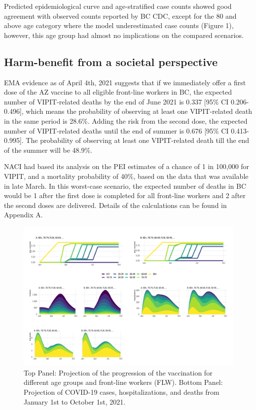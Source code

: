 \documentclass[]{interact}
\theoremstyle{plain}%
\theoremstyle{definition}
\theoremstyle{remark}
\begin{document}
Predicted epidemiological curve and age-stratified case counts showed
good agreement with observed counts reported by BC CDC, except for the
80 and above age category where the model underestimated case counts
(Figure 1), however, this age group had almost no implications on the
compared scenarios.

\hypertarget{harm-benefit-from-a-societal-perspective}{%
\subsection{Harm-benefit from a societal
perspective}\label{harm-benefit-from-a-societal-perspective}}

EMA evidence as of April 4th, 2021 suggests that if we immediately offer
a first dose of the AZ vaccine to all eligible front-line workers in BC,
the expected number of VIPIT-related deaths by the end of June 2021 is
0.337 {[}95\% CI 0.206-0.496{]}, which means the probability of
observing at least one VIPIT-related death in the same period is 28.6\%.
Adding the risk from the second dose, the expected number of
VIPIT-related deaths until the end of summer is 0.676 {[}95\% CI
0.413-0.995{]}. The probability of observing at least one VIPIT-related
death till the end of the summer will be 48.9\%.

NACI had based its analysis on the PEI estimates of a chance of 1 in
100,000 for VIPIT, and a mortality probability of 40\%, based on the
data that was available in late March. In this worst-case scenario, the
expected number of deaths in BC would be 1 after the first dose is
completed for all front-line workers and 2 after the second doses are
delivered. Details of the calculations can be found in Appendix A.

\begin{figure}

{\centering \includegraphics[width=1\linewidth]{../figures/fig-trajectoriesFull} 

}

\caption{Top Panel: Projection of the progression of the vaccination for different age groups and front-line workers (FLW). Bottom Panel: Projection of COVID-19 cases, hospitalizations, and deaths from January 1st to October 1st, 2021.}\label{fig:fig1}
\end{figure}
\end{document}
